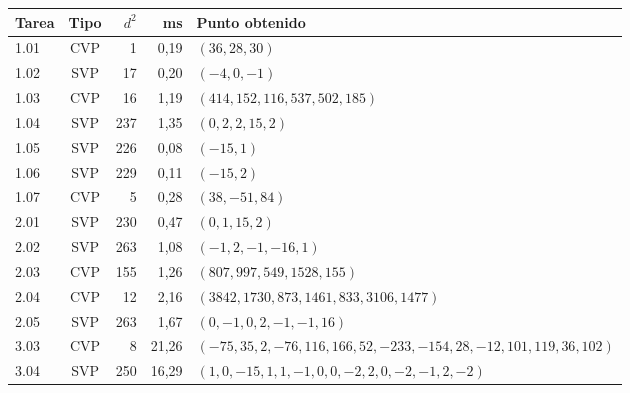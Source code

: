 \setlength{\tabcolsep}{5pt}
\begin{tabular}{@{}lcrrl@{}}
\toprule
Tarea & Tipo & $d^2$ & ms & Punto obtenido\\
\midrule
1.01 & CVP & 1 & 0{,}19 & $(36,28,30)$ \\
1.02 & SVP & 17 & 0{,}20 & $(-4,0,-1)$ \\
1.03 & CVP & 16 & 1{,}19 & $(414,152,116,537,502,185)$ \\
1.04 & SVP & 237 & 1{,}35 & $(0,2,2,15,2)$ \\
1.05 & SVP & 226 & 0{,}08 & $(-15,1)$ \\
1.06 & SVP & 229 & 0{,}11 & $(-15,2)$ \\
1.07 & CVP & 5 & 0{,}28 & $(38,-51,84)$ \\
2.01 & SVP & 230 & 0{,}47 & $(0,1,15,2)$ \\
2.02 & SVP & 263 & 1{,}08 & $(-1,2,-1,-16,1)$ \\
2.03 & CVP & 155 & 1{,}26 & $(807,997,549,1528,155)$ \\
2.04 & CVP & 12 & 2{,}16 & $(3842,1730,873,1461,833,3106,1477)$ \\
2.05 & SVP & 263 & 1{,}67 & $(0,-1,0,2,-1,-1,16)$ \\
3.03 & CVP & 8 & 21{,}26 & $(-75,35,2,-76,116,166,52,-233,-154,28,-12,101,119,36,102)$ \\
3.04 & SVP & 250 & 16{,}29 & $(1,0,-15,1,1,-1,0,0,-2,2,0,-2,-1,2,-2)$ \\
\bottomrule
\end{tabular}
